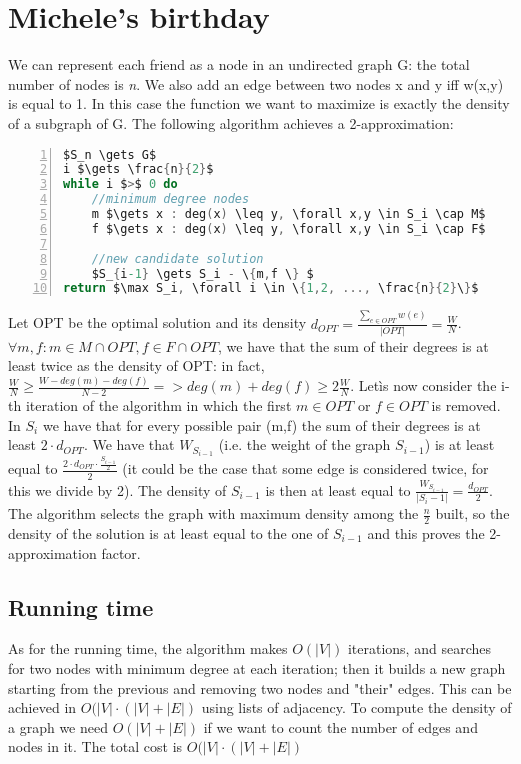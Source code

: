\section{Michele's birthday}
We can represent each friend as a node in an undirected graph G: the total number of nodes is \textit{n}. We also add an edge between two nodes x and y iff w(x,y) is equal to 1.
In this case the function we want to maximize is exactly the density \cite{Dense subgraph} of a subgraph of G. The following algorithm achieves a 2-approximation: \begin{lstlisting}[language=C,mathescape=true, frame=single, numbers=left]
$S_n \gets G$
i $\gets \frac{n}{2}$
while i $>$ 0 do
	//minimum degree nodes
	m $\gets x : deg(x) \leq y, \forall x,y \in S_i \cap M$
	f $\gets x : deg(x) \leq y, \forall x,y \in S_i \cap F$
	
	//new candidate solution
	$S_{i-1} \gets S_i - \{m,f \} $
return $\max S_i, \forall i \in \{1,2, ..., \frac{n}{2}\}$ 
\end{lstlisting}
Let OPT be the optimal solution and its density $d_{OPT} = \frac{\sum_{e \in OPT} w(e)}{|OPT|} = \frac{W}{N}$.
$\forall m,f: m \in M \cap OPT, f \in F \cap OPT$, we have that the sum of their degrees is at least twice as the density of OPT: in fact, $\frac{W}{N} \geq \frac{W - deg(m) - deg(f)}{N -2} => deg(m) + deg(f) \geq 2 \frac{W}{N}$.
Letìs now consider the i-th iteration of the algorithm in which the first $m \in OPT$ or $f \in OPT$ is removed. In $S_i$ we have that for every possible pair (m,f) the sum of their degrees is at least $2 \cdot d_{OPT}$.
We have that $W_{S_{i-1}}$ (i.e. the weight of the graph $S_{i-1}$) is at least equal to $\frac{2\cdot d_{OPT}\cdot \frac{S_{i-1}}{2}}{2}$ (it could be the case that some edge is considered twice, for this we divide by 2). The density of $S_{i-1}$ is then at least equal to $\frac{W_{S_{i-1}} } {|S_i-1|} = \frac{d_{OPT}}{2}$. The algorithm selects the graph with maximum density among the $\frac{n}{2}$ built, so the density of the solution is at least equal to the one of $S_{i-1}$ and this proves the 2-approximation factor.

\subsection*{Running time}
As for the running time, the algorithm makes $O(|V|)$ iterations, and searches for two nodes with minimum degree at each iteration; then it builds a new graph starting from the previous and removing two nodes and "their" edges. This can be achieved in $O(|V|\cdot (|V|+|E|)$ using lists of adjacency. To compute the density of a graph we need $O(|V|+|E|)$ if we want to count the number of edges and nodes in it. The total cost is $O(|V|\cdot (|V|+|E|)$